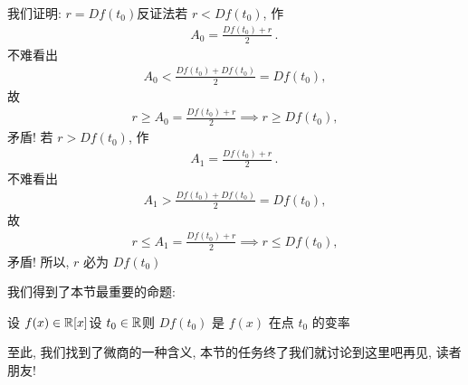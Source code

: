 我们证明: $r = Df(t_0)$\period 反证法\period 若 $r < Df(t_0)$, 作
\begin{align*}
    A_0 = \frac{Df(t_0) + r}{2} \period
\end{align*}
不难看出
\begin{align*}
    A_0 < \frac{Df(t_0) + Df(t_0)}{2} = Df(t_0),
\end{align*}
故
\begin{align*}
    r \geq A_0 = \frac{Df(t_0) + r}{2} \implies r \geq Df(t_0),
\end{align*}
矛盾! 若 $r > Df(t_0)$, 作
\begin{align*}
    A_1 = \frac{Df(t_0) + r}{2} \period
\end{align*}
不难看出
\begin{align*}
    A_1 > \frac{Df(t_0) + Df(t_0)}{2} = Df(t_0),
\end{align*}
故
\begin{align*}
    r \leq A_1 = \frac{Df(t_0) + r}{2} \implies r \leq Df(t_0),
\end{align*}
矛盾! 所以, $r$ 必为 $Df(t_0)$\period

我们得到了本节最重要的命题:

\begin{proposition}
    设 $f (x) \in \mathbb{R}[x]$\period 设 $t_0 \in \mathbb{R}$\period 则 $Df(t_0)$ 是 $f(x)$ 在点 $t_0$ 的变率\period
\end{proposition}

至此, 我们找到了微商的一种含义, 本节的任务终了\period 我们就讨论到这里吧\period 再见, 读者朋友!
